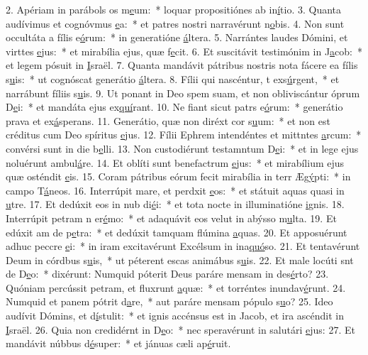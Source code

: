 2. Apériam in parábols os m\uline{e}um:~* loquar propositiónes ab in\uline{í}tio.
3. Quanta audívimus et cognóvmus \uline{e}a:~* et patres nostri narravérunt n\uline{o}bis.
4. Non sunt occultáta a fílis e\uline{ó}rum:~* in generatióne \uline{á}ltera.
5. Narrántes laudes Dómini, et virttes \uline{e}jus:~* et mirabília ejus, quæ f\uline{e}cit.
6. Et suscitávit testimónim in J\uline{a}cob:~* et legem pósuit in \uline{I}sraël.
7. Quanta mandávit pátribus nostris nota fácere ea fílis s\uline{u}is:~* ut cognóscat generátio \uline{á}ltera.
8. Fílii qui nascéntur, t exs\uline{ú}rgent,~* et narrábunt fíliis s\uline{u}is.
9. Ut ponant in Deo spem suam, et non obliviscántur óprum D\uline{e}i:~* et mandáta ejus ex\uline{quí}rant.
10. Ne fiant sicut patrs e\uline{ó}rum:~* generátio prava et ex\uline{á}sperans.
11. Generátio, quæ non diréxt cor s\uline{u}um:~* et non est créditus cum Deo spíritus \uline{e}jus.
12. Fílii Ephrem intendéntes et mittntes \uline{a}rcum:~* convérsi sunt in die b\uline{e}lli.
13. Non custodiérunt testamntum D\uline{e}i:~* et in lege ejus noluérunt ambul\uline{á}re.
14. Et oblíti sunt benefactrum \uline{e}jus:~* et mirabílium ejus quæ osténdit \uline{e}is.
15. Coram pátribus eórum fecit mirabília in terr Æg\uline{ý}pti:~* in campo T\uline{á}neos.
16. Interrúpit mare, et perdxit \uline{e}os:~* et státuit aquas quasi in \uline{u}tre.
17. Et dedúxit eos in nub di\uline{é}i:~* et tota nocte in illuminatióne \uline{i}gnis.
18. Interrúpit petram n er\uline{é}mo:~* et adaquávit eos velut in abýsso m\uline{u}lta.
19. Et edúxit am de p\uline{e}tra:~* et dedúxit tamquam flúmina \uline{a}quas.
20. Et apposuérunt adhuc peccre \uline{e}i:~* in iram excitavérunt Excélsum in ina\uline{quó}so.
21. Et tentavérunt Deum in córdbus s\uline{u}is,~* ut péterent escas animábus s\uline{u}is.
22. Et male locúti snt de D\uline{e}o:~* dixérunt: Numquid póterit Deus paráre mensam in des\uline{é}rto?
23. Quóniam percússit petram, et fluxrunt \uline{a}quæ:~* et torréntes inundav\uline{é}runt.
24. Numquid et panem pótrit d\uline{a}re,~* aut paráre mensam pópulo s\uline{u}o?
25. Ideo audívit Dómins, et d\uline{í}stulit:~* et ignis accénsus est in Jacob, et ira ascéndit in \uline{I}sraël.
26. Quia non credidérnt in D\uline{e}o:~* nec speravérunt in salutári \uline{e}jus:
27. Et mandávit núbbus d\uline{é}super:~* et jánuas cæli ap\uline{é}ruit.
